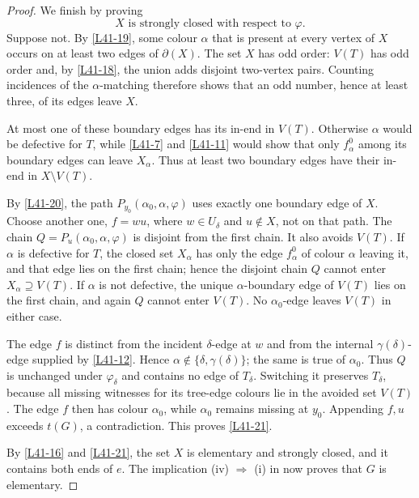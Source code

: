 \documentclass[11pt]{article}
\theoremstyle{definition}
\newcommand{\set}[1]{\{#1\}}
\newcommand{\comp}{\mathbin{\setminus}}
\begin{document}
\begin{proof}
We finish by proving
\begin{equation}
 X\text{ is strongly closed with respect to }\varphi.
 \tag{21}\label{L41-21}
\end{equation}
Suppose not. By \eqref{L41-19}, some colour $\alpha$ that is present at
every vertex of $X$ occurs on at least two edges of $\partial(X)$. The set
$X$ has odd order: $V(T)$ has odd order and, by \eqref{L41-18}, the union
adds disjoint two-vertex pairs. Counting incidences of the
$\alpha$-matching therefore shows that an odd number, hence at least three,
of its edges leave $X$.

At most one of these boundary edges has its in-end in $V(T)$. Otherwise
$\alpha$ would be defective for $T$, while \eqref{L41-7} and
\eqref{L41-11} would show that only $f^0_\alpha$ among its boundary edges
can leave $X_\alpha$. Thus at least two boundary edges have their in-end in
$X\comp V(T)$.

By \eqref{L41-20}, the path
$P_{y_0}(\alpha_0,\alpha,\varphi)$ uses exactly one boundary edge of $X$.
Choose another one, $f=wu$, where $w\in U_\delta$ and $u\notin X$, not on
that path. The chain
$Q=P_u(\alpha_0,\alpha,\varphi)$ is disjoint from the first chain. It also
avoids $V(T)$. If $\alpha$ is defective for $T$, the closed set
$X_\alpha$ has only the edge $f^0_\alpha$ of colour $\alpha$ leaving it,
and that edge lies on the first chain; hence the disjoint chain $Q$ cannot
enter $X_\alpha\supseteq V(T)$. If $\alpha$ is not defective, the unique
$\alpha$-boundary edge of $V(T)$ lies on the first chain, and again $Q$
cannot enter $V(T)$. No $\alpha_0$-edge leaves $V(T)$ in either case.

The edge $f$ is distinct from the incident $\delta$-edge at $w$ and from
the internal $\gamma(\delta)$-edge supplied by \eqref{L41-12}. Hence
$\alpha\notin\set{\delta,\gamma(\delta)}$; the same is true of
$\alpha_0$. Thus $Q$ is unchanged under $\varphi_\delta$ and contains no
edge of $T_\delta$. Switching it preserves $T_\delta$, because all
missing witnesses for its tree-edge colours lie in the avoided set
$V(T)$. The edge $f$ then has colour $\alpha_0$, while $\alpha_0$ remains
missing at $y_0$. Appending $f,u$ exceeds $t(G)$, a contradiction. This
proves \eqref{L41-21}.

By \eqref{L41-16} and \eqref{L41-21}, the set $X$ is elementary and
strongly closed, and it contains both ends of $e$. The implication \textup{(iv)} $\Rightarrow$ \textup{(i)} in
 now proves that $G$ is elementary.
\end{proof}
\end{document}
